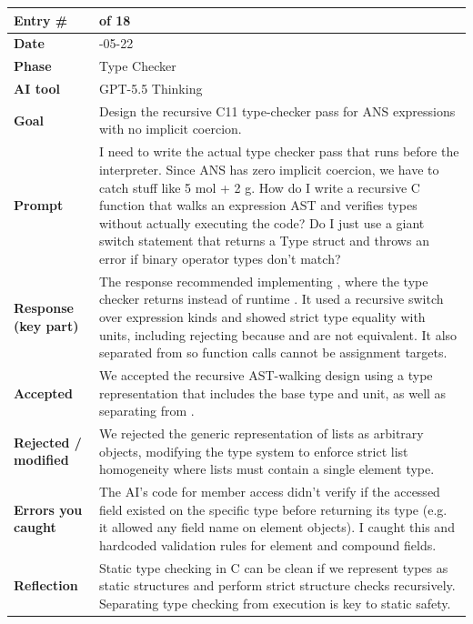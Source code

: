\documentclass[11pt,a4paper]{article}
\newcommand{\code}[1]{\texttt{\detokenize{#1}}}
\newcommand{\entrygap}{\vspace{8pt}}
\newenvironment{journalentry}{%
  \begin{center}\small\renewcommand{\arraystretch}{1.22}%
  \begin{tabular}{|>{\columncolor{anscodebg}\bfseries}p{3.0cm}|>{\RaggedRight\arraybackslash}p{12.25cm}|}%
  \hline
}{%
  \end{tabular}\end{center}\entrygap
}
\begin{document}
\begin{journalentry}
Entry \# & 17 of 18 \\ \hline
Date & 2026-05-22 \\ \hline
Phase & Type Checker \\ \hline
AI tool & GPT-5.5 Thinking \\ \hline
Goal & Design the recursive C11 type-checker pass for ANS expressions with no implicit coercion. \\ \hline
Prompt & I need to write the actual type checker pass that runs before the interpreter. Since ANS has zero implicit coercion, we have to catch stuff like 5 mol + 2 g. How do I write a recursive C function that walks an expression AST and verifies types without actually executing the code? Do I just use a giant switch statement that returns a Type struct and throws an error if binary operator types don't match? \\ \hline
Response (key part) & The response recommended implementing \code{bool check\_expr(TypeChecker *tc, const Expr *expr, Type *out, Error *err)}, where the type checker returns \code{Type} instead of runtime \code{Value}. It used a recursive switch over expression kinds and showed strict type equality with units, including rejecting \code{5 mol + 2 g} because \code{Quantity<mol>} and \code{Quantity<g>} are not equivalent. It also separated \code{check\_lvalue} from \code{check\_expr} so function calls cannot be assignment targets. \\ \hline
Accepted & We accepted the recursive AST-walking \code{check\_expr} design using a type representation that includes the base type and unit, as well as separating \code{check\_lvalue} from \code{check\_expr}. \\ \hline
Rejected / modified & We rejected the generic representation of lists as arbitrary objects, modifying the type system to enforce strict list homogeneity where lists must contain a single element type. \\ \hline
Errors you caught & The AI's code for member access didn't verify if the accessed field existed on the specific type before returning its type (e.g. it allowed any field name on element objects). I caught this and hardcoded validation rules for element and compound fields. \\ \hline
Reflection & Static type checking in C can be clean if we represent types as static structures and perform strict structure checks recursively. Separating type checking from execution is key to static safety. \\ \hline
\end{journalentry}
\end{document}
